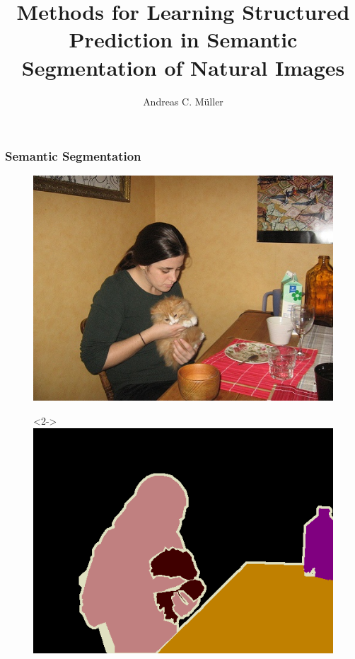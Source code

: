 \documentclass[final,ignorenonframetext,compress]{beamer}
\title[Stuctured Prediction for Semantic Segmentation] %
{Methods for Learning Structured Prediction in Semantic Segmentation of Natural Images}
\author%
{Andreas C. M\"uller}
\institute[] %
{%
    University of Bonn
}
\begin{document}
\begin{frame}
    \titlepage
\end{frame}

\begin{frame}
    \tableofcontents
\end{frame}

\begin{frame}
    \frametitle{Semantic Segmentation}
        \begin{figure}
            \includegraphics[width=.4 \textwidth]{images/pascal}
            \begin{visibleenv}<2->
                \includegraphics[width=.4 \textwidth]{images/pascal_gt}
            \end{visibleenv}
        \end{figure}
\end{frame}
\end{document}
